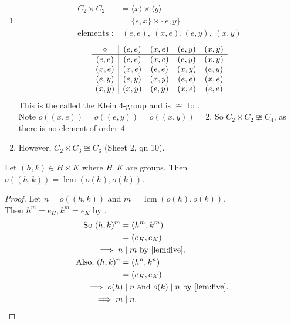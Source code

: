 \begin{example} ~\vspace*{-1.5\baselineskip}
  \begin{enumerate}
    \item 
      \begin{align*}
        C_2 \times C_2 &= \langle x \rangle \times \langle y \rangle \\
        &= \{ e, x \} \times \{e, y\} \\
        \text{elements :} &\ (e, e),\ (x, e), (e, y),\ (x, y)
      \end{align*} 
      \begin{align*}
        \begin{array}{c | cccc}
          \circ & (e, e) & (x, e) & (e, y) & (x, y) \\
          \hline
          (e, e) & (e, e) & (x, e) & (e, y) & (x, y) \\
          (x, e) & (x, e) & (e, e) & (x, y) & (e, y) \\
          (e, y) & (e, y) & (x, y) & (e, e) & (x, e) \\
          (x, y) & (x, y) & (e, y) & (x, e) & (e, e)
        \end{array}
      \end{align*} 
      This is the called the Klein 4-group and is $\cong$ to .\\
      Note $o\left( (x, e) \right) = o\left( (e, y) \right) = o\left( (x, y) \right) = 2$. So $C_2 \times C_2 \ncong C_4$, as there is no element of order $4$.
    \item However, $C_2 \times C_3 \cong C_6$ (Sheet 2, qn 10).
  \end{enumerate} 
\end{example} 

\begin{lemma}
    Let $(h, k) \in H \times K$ where $H, K$ are groups. 
    Then $o\left( (h, k) \right) = \operatorname{lcm} \left( o(h), o(k) \right)$.
\end{lemma} 

\begin{proof}
  Let $n = o\left( (h, k) \right)$ and $m = \operatorname{lcm} \left( o(h), o(k) \right)$.\\
  Then $h^m = e_H, k^m = e_K$ by .
  \begin{align*}
    \text{So } (h, k)^m &= (h^m, k^m) \\
    &= (e_H, e_K) \\
    \implies n \mkern-5mu &\;\mid m \text{ by \Cref{lem:five}}. \\
    \text{Also, } (h, k)^n &= (h^n, k^n) \\
    &= (e_H, e_K) \\
    \implies o(h) \mkern-5mu &\;\mid n \text{ and } o(k) \mid n \text{ by \Cref{lem:five}}. \\
    \implies m \mkern-5mu &\;\mid n.
  \end{align*} 
\end{proof} 

